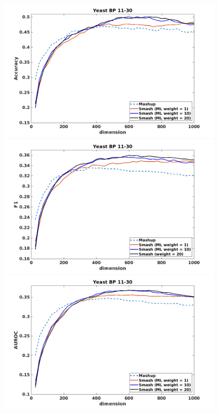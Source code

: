 \documentclass[12pt]{amsart}
\theoremstyle{remark}
\theoremstyle{definition}
\numberwithin{equation}{section} \numberwithin{table}{section}
\numberwithin{figure}{section}
\numberwithin{algorithm}{section}
\numberwithin{theorem}{section}
\begin{document}
\begin{figure}[h!]
	\centering
	\includegraphics[width=.8\linewidth]{Yeast-BP-11-30-Acc}  \\
	\includegraphics[width=.8\linewidth]{Yeast-BP-11-30-F1}  \\
	\includegraphics[width=.8\linewidth]{Yeast-BP-11-30-AUROC} 
\end{figure}
\end{document}
